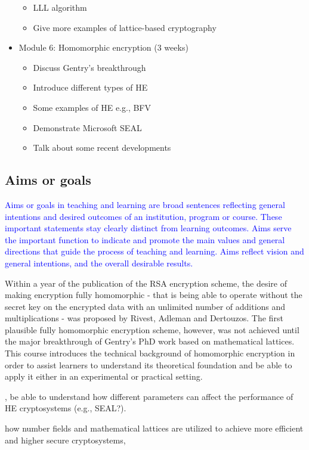 \documentclass[../main.tex]{subfiles}
\begin{document}
\begin{itemize}
\begin{itemize}
            \item LLL algorithm
            \item Give more examples of lattice-based cryptography 
        \end{itemize}
    \item Module 6: Homomorphic encryption (3 weeks) 
        \begin{itemize}
            \item Discuss Gentry's breakthrough
            \item Introduce different types of HE
            \item Some examples of HE e.g., BFV
            \item Demonstrate Microsoft SEAL
            \item Talk about some recent developments 
        \end{itemize}
\end{itemize}


\subsection{Aims or goals}
\textcolor{blue}{Aims or goals in teaching and learning are broad sentences reflecting general intentions
and desired outcomes of an institution, program or course.
These important statements stay clearly distinct from learning outcomes. Aims serve the
important function to indicate and promote the main values and general directions that
guide the process of teaching and learning.
Aims reflect vision and general intentions, and the overall desirable results.}


Within a year of the publication of the RSA encryption scheme, the desire of making encryption fully homomorphic - that is being able to operate without the secret key on the encrypted data with an unlimited number of additions and multiplications - was proposed by Rivest, Adleman and Dertouzos. 
The first plausible fully homomorphic encryption scheme, however, was not achieved until the major breakthrough of Gentry's PhD work based on mathematical lattices. 
This course introduces the technical background of homomorphic encryption in order to assist learners to understand its theoretical foundation and be able to apply it either in  an experimental or practical setting. 

\iffalse
, be able to understand how different parameters can affect the performance of HE cryptosystems (e.g., SEAL?).  

how number fields and mathematical lattices are utilized to achieve more efficient and higher secure cryptosystems, 
\end{document}
